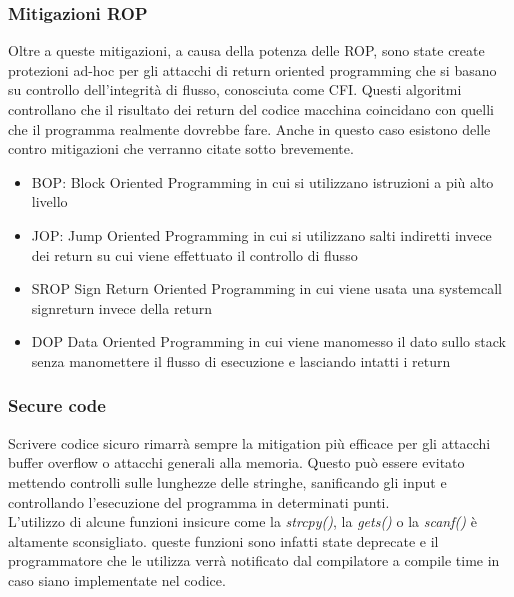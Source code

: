 \subsubsection*{Mitigazioni ROP}
Oltre a queste mitigazioni, a causa della potenza delle ROP, sono state create protezioni ad-hoc per gli attacchi di return oriented programming che si basano su controllo dell'integrità di flusso, conosciuta come CFI. Questi algoritmi controllano che il risultato dei return del codice macchina coincidano con quelli che il programma realmente dovrebbe fare. Anche in questo caso esistono delle contro mitigazioni che verranno citate sotto brevemente.
\begin{itemize}
    \item BOP: Block Oriented Programming in cui si utilizzano istruzioni a più alto livello
    \item JOP: Jump Oriented Programming in cui si utilizzano salti indiretti invece dei return su cui viene effettuato il controllo di flusso
    \item SROP Sign Return Oriented Programming in cui viene usata una systemcall signreturn \cite{man7sigret} invece della return
    \item DOP Data Oriented Programming in cui viene manomesso il dato sullo stack senza manomettere il flusso di esecuzione e lasciando intatti i return
\end{itemize}
\subsubsection*{Secure code}
Scrivere codice sicuro rimarrà sempre la mitigation più efficace per gli attacchi buffer overflow o attacchi generali alla memoria. Questo può essere evitato mettendo controlli sulle lunghezze delle stringhe, sanificando gli input e controllando l'esecuzione del programma in determinati punti.\\
L'utilizzo di alcune funzioni insicure come la \textit{strcpy()}, la \textit{gets()} o la \textit{scanf()} è altamente sconsigliato. queste funzioni sono infatti state deprecate e il programmatore che le utilizza verrà notificato dal compilatore a compile time in caso siano implementate nel codice.

